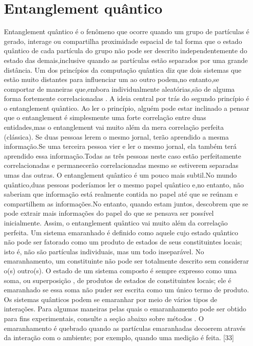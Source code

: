 \documentclass{report}
\begin{document}
\section{Entanglement quântico}
Entanglement quântico é o fenômeno que ocorre quando um grupo de partículas é gerado, interage ou compartilha proximidade espacial de tal forma que o estado quântico de cada partícula do grupo não pode ser descrito independentemente do estado das demais,inclusive quando as partículas estão separados por uma grande distância.
\newline
Um dos princípios da computação quântica diz que dois sistemas que estão muito distantes para influenciar um ao outro podem,no entanto,se comportar de maneiras que,embora individualmente aleatórias,são de alguma forma fortemente correlacionadas .
A ideia central por trás do segundo princípio é o entanglement quântico. Ao ler o princípio, alguém pode estar inclinado a pensar que o entanglement é simplesmente uma forte correlação entre duas entidades,mas o entanglement vai muito além da mera correlação perfeita (clássica). Se duas pessoas lerem o mesmo jornal, terão aprendido a mesma informação.Se uma terceira pessoa vier e ler o mesmo jornal, ela também terá aprendido essa informação.Todas as três pessoas neste caso estão perfeitamente correlacionadas e permanecerão correlacionadas mesmo se estiverem separadas umas das outras.
O entanglement quântico é um pouco mais subtil.No mundo quântico,duas pessoas poderíamos ler o mesmo papel quântico e,no entanto, não saberiam que informação está realmente contida no papel até que se reúnam e compartilhem as informações.No entanto, quando estam juntos, descobrem que se pode extrair mais informações do papel do que se pensava ser possível inicialmente. Assim, o entanglement quântico vai muito além da correlação perfeita.
\newline
Um sistema emaranhado é definido como aquele cujo estado quântico não pode ser fatorado como um produto de estados de seus constituintes locais; isto é, não são partículas individuais, mas um todo inseparável. No emaranhamento, um constituinte não pode ser totalmente descrito sem considerar o(s) outro(s). O estado de um sistema composto é sempre expresso como uma soma, ou superposição , de produtos de estados de constituintes locais; ele é emaranhado se essa soma não puder ser escrita como um único termo de produto.
\newline
Os sistemas quânticos podem se emaranhar por meio de vários tipos de interações. Para algumas maneiras pelas quais o emaranhamento pode ser obtido para fins experimentais, consulte a seção abaixo sobre métodos . O emaranhamento é quebrado quando as partículas emaranhadas decoerem através da interação com o ambiente; por exemplo, quando uma medição é feita. [33]
\end{document}
